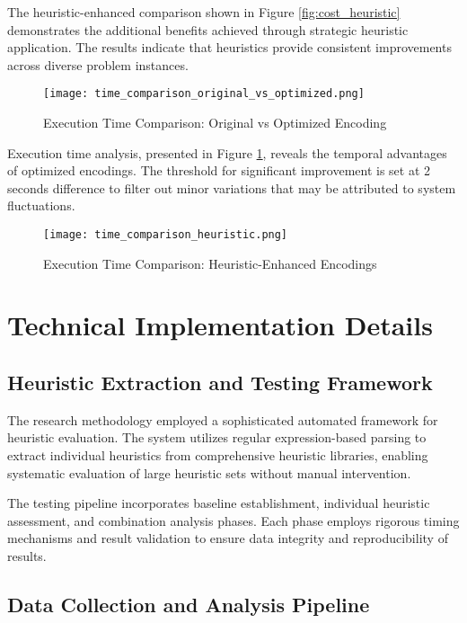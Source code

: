 \documentclass[11pt,a4paper]{article}
\begin{document}
The heuristic-enhanced comparison shown in Figure \ref{fig:cost_heuristic} demonstrates the additional benefits achieved through strategic heuristic application. The results indicate that heuristics provide consistent improvements across diverse problem instances.

\begin{figure}[H]
    \centering
    \texttt{[image: time\_comparison\_original\_vs\_optimized.png]}
    \caption{Execution Time Comparison: Original vs Optimized Encoding}
    \label{fig:time_orig_opt}
\end{figure}

Execution time analysis, presented in Figure \ref{fig:time_orig_opt}, reveals the temporal advantages of optimized encodings. The threshold for significant improvement is set at 2 seconds difference to filter out minor variations that may be attributed to system fluctuations.

\begin{figure}[H]
    \centering
    \texttt{[image: time\_comparison\_heuristic.png]}
    \caption{Execution Time Comparison: Heuristic-Enhanced Encodings}
    \label{fig:time_heuristic}
\end{figure}

\section{Technical Implementation Details}

\subsection{Heuristic Extraction and Testing Framework}

The research methodology employed a sophisticated automated framework for heuristic evaluation. The system utilizes regular expression-based parsing to extract individual heuristics from comprehensive heuristic libraries, enabling systematic evaluation of large heuristic sets without manual intervention.

The testing pipeline incorporates baseline establishment, individual heuristic assessment, and combination analysis phases. Each phase employs rigorous timing mechanisms and result validation to ensure data integrity and reproducibility of results.

\subsection{Data Collection and Analysis Pipeline}
\end{document}
